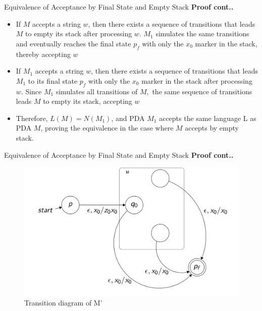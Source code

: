 \documentclass{beamer}
\begin{document}
\begin{frame}{ Equivalence of Acceptance by Final State and Empty Stack}
	\textbf{Proof cont..}
	\begin{itemize}
		\item If $M$ accepts a string $w$, then there exists a sequence of transitions that leads $M$ to empty its stack after processing $w$. $M_1$ simulates the same transitions and eventually reaches the final state $p_f$ with only the $x_0$ marker in the stack, thereby accepting $w$
		\item If $M_1$ accepts a string $w$, then there exists a sequence of transitions that leads $M_1$ to its final state $p_f$ with only the $x_0$ marker in the stack after processing $w$. Since $M_1$ simulates all transitions of $M,$ the same sequence of transitions leads $M$ to empty its stack, accepting $w$
		\item Therefore, $L(M) = N(M_1)$, and PDA $M_1$ accepts the same language L as PDA $M$, proving the equivalence in the case where $M$ accepts by empty stack.
	\end{itemize}
\end{frame}
\begin{frame}{ Equivalence of Acceptance by Final State and Empty Stack}
	\textbf{Proof cont..}
	\begin{center}
		\begin{figure}
			\includegraphics[scale=.3]{img4/m3}
			\caption{Transition diagram of M'}
		\end{figure}
	\end{center}
\end{frame}
\end{document}
